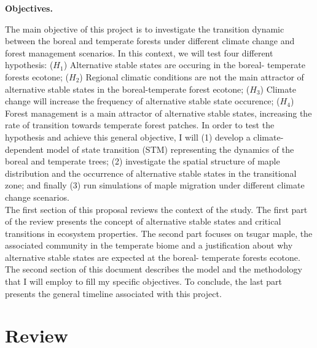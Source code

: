 

\textbf{Objectives.}

The main objective of this project is to investigate the transition dynamic
between the boreal and temperate forests under different climate change and
forest management scenarios. In this context, we will test four different
hypothesis: ($H_1$) Alternative stable states are occuring in the boreal-
temperate forests ecotone; ($H_2$) Regional climatic conditions are not the
main attractor of alternative stable states in the boreal-temperate forest
ecotone; ($H_3$) Climate change will increase the frequency of alternative
stable state occurence; ($H_4$) Forest management is a main attractor of
alternative stable states, increasing the rate of transition towards temperate
forest patches. In order to test the hypothesis and achieve this general
objective, I will (1) develop a climate-dependent model of state transition
(STM) representing the dynamics of the boreal and temperate trees; (2)
investigate the spatial structure of maple distribution and the occurrence of
alternative stable states in the transitional zone; and finally (3) run
simulations of maple migration under different climate change
scenarios. \\

The first section of this proposal reviews the context of the study. The first
part of the review presents the concept of alternative stable states and
critical transitions in ecosystem properties. The second part focuses on
tsugar maple, the associated community in the temperate biome and a
justification about  why alternative stable states are expected at the boreal-
temperate forests ecotone.  The second section of this document describes the
model and the methodology that I will employ to fill my specific  objectives.
To conclude, the last part presents the general timeline associated with this
project.


\section{Review} 

